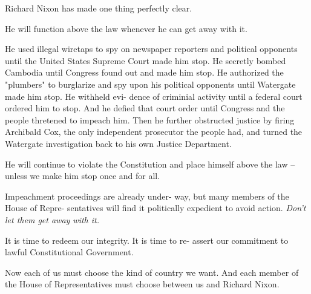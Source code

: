 \documentclass{article}
\begin{document}
\begin{multicols}{3}


Richard Nixon has made one thing perfectly clear.

He will function above the law whenever he can get\linebreak
away with it.

He used illegal wiretaps to spy on newspaper\linebreak
reporters and political opponents until the United\linebreak
States Supreme Court made him stop. He secretly\linebreak
bombed Cambodia until Congress found out and\linebreak
made him stop. He authorized the "plumbers" to \linebreak
burglarize and spy upon his political opponents\linebreak
 until Watergate made him stop. He withheld evi-\linebreak
 dence of criminial activity until a federal court ordered\linebreak
 him to stop. And he defied that court order until\linebreak
 Congress and the people thretened to impeach\linebreak
 him. Then he further obstructed justice by firing\linebreak
 Archibald Cox, the only independent prosecutor\linebreak
 the people had, and turned the Watergate investiga\-tion back to his own Justice Department.

He will continue to violate the Constitution and\linebreak
place himself above the law -- unless we make him\linebreak
stop once and for all.

Impeachment proceedings are already under-\linebreak
way, but many members of the House of Repre-\linebreak
sentatives will find it politically expedient to avoid
action. \textit{Don't let them get away with it.}

It is time to redeem our integrity. It is time to re-\lb
assert our commitment to lawful Constitutional\lb
Government.

Now each of us must choose the kind of country\linebreak
we want. And each member of the House of\linebreak
Representatives must choose between us and\linebreak
Richard Nixon.


\end{multicols}
\end{document}
